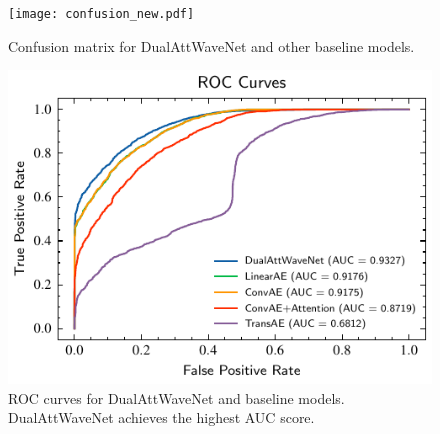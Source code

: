 \documentclass[conference]{IEEEtran}
\begin{document}
\begin{figure}[htbp]
    \centering
    \texttt{[image: confusion\_new.pdf]}
    \caption{Confusion matrix for DualAttWaveNet and other baseline models.}
    \label{fig:confusion_matrix}
\end{figure}






\begin{figure}[htbp]
    \centering
    \includegraphics[width=0.8\linewidth]{roc-comparison.pdf}
    \caption{ROC curves for DualAttWaveNet and baseline models. DualAttWaveNet achieves the highest AUC score.}
    \label{fig:roc_comparison}
\end{figure}






\end{document}
